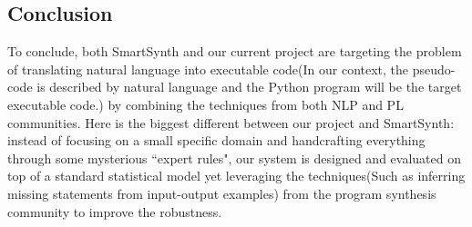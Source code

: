 \documentclass[10pt]{article}
\begin{document}
\subsection{Conclusion}
To conclude, both SmartSynth and our current project are targeting the problem 
of translating natural language into executable code(In our context, the pseudo-code
is described by natural language and the Python program will be the target
executable code.) by combining the techniques
from both NLP and PL communities. Here is the biggest different between our 
project and SmartSynth: instead of focusing on a small specific domain
and handcrafting everything through some mysterious ``expert rules", our system
is designed and evaluated on top of a standard statistical model yet leveraging
the techniques(Such as inferring missing statements from input-output examples) 
from the program synthesis community to improve the robustness.



\end{document}
